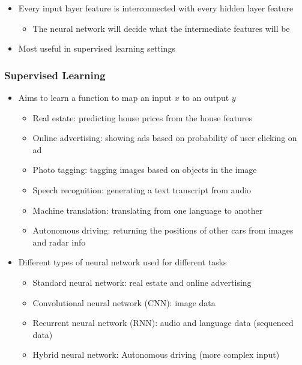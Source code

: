 \documentclass[12pt, letterpaper]{article}
\begin{document}
\begin{itemize}
\begin{figure}[ht]
        \end{figure}
        \item Every input layer feature is interconnected with every hidden layer feature
        \begin{itemize}
            \item The neural network will decide what the intermediate features will be
        \end{itemize}
        \item Most useful in supervised learning settings
    \end{itemize}
    \hspace{3mm}
    \subsubsection{Supervised Learning}
    \begin{itemize}
        \item Aims to learn a function to map an input $x$ to an output $y$
        \begin{itemize}
            \item Real estate: predicting house prices from the house features
            \item Online advertising: showing ads based on probability of user clicking on ad
            \item Photo tagging: tagging images based on objects in the image
            \item Speech recognition: generating a text transcript from audio
            \item Machine translation: translating from one language to another
            \item Autonomous driving: returning the positions of other cars from images and radar info
        \end{itemize}
        \item Different types of neural network used for different tasks
        \begin{itemize}
            \item Standard neural network: real estate and online advertising
            \item Convolutional neural network (CNN): image data
            \item Recurrent neural network (RNN): audio and language data (sequenced data)
            \item Hybrid neural network: Autonomous driving (more complex input)
        \end{itemize}

\end{itemize}
\end{document}
